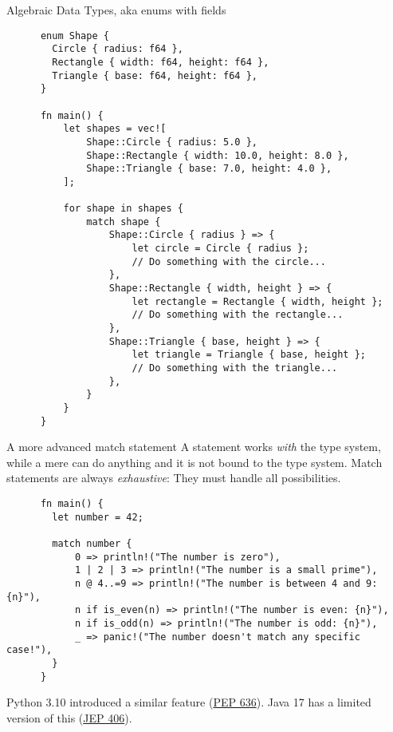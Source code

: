 \documentclass{beamer}
\begin{document}
\begin{frame}[fragile]{Algebraic Data Types, aka enums with fields}
  \begin{listing}
    \begin{verbatim}
      enum Shape {
        Circle { radius: f64 },
        Rectangle { width: f64, height: f64 },
        Triangle { base: f64, height: f64 },
      }
    
      fn main() {
          let shapes = vec![
              Shape::Circle { radius: 5.0 },
              Shape::Rectangle { width: 10.0, height: 8.0 },
              Shape::Triangle { base: 7.0, height: 4.0 },
          ];
      
          for shape in shapes {
              match shape {
                  Shape::Circle { radius } => {
                      let circle = Circle { radius };
                      // Do something with the circle...
                  },
                  Shape::Rectangle { width, height } => {
                      let rectangle = Rectangle { width, height };
                      // Do something with the rectangle...
                  },
                  Shape::Triangle { base, height } => {
                      let triangle = Triangle { base, height };
                      // Do something with the triangle...
                  },
              }
          }
      }
    \end{verbatim}
  \end{listing}
\end{frame}

\begin{frame}[fragile]{A more advanced match statement}
  A  statement works \emph{with} the type system,
  while a mere  can do anything and it is not bound to the type system.
  Match statements are always \emph{exhaustive}: They must handle all possibilities.

  \begin{listing}
    \begin{verbatim}
      fn main() {
        let number = 42;
    
        match number {
            0 => println!("The number is zero"),
            1 | 2 | 3 => println!("The number is a small prime"),
            n @ 4..=9 => println!("The number is between 4 and 9: {n}"),
            n if is_even(n) => println!("The number is even: {n}"),
            n if is_odd(n) => println!("The number is odd: {n}"),
            _ => panic!("The number doesn't match any specific case!"),
        }
      }
    \end{verbatim}
  \end{listing}

  Python 3.10 introduced a similar feature (\href{https://peps.python.org/pep-0636/}{PEP 636}).
  Java 17 has a limited version of this (\href{https://openjdk.org/jeps/406}{JEP 406}).
\end{frame}
\end{document}
